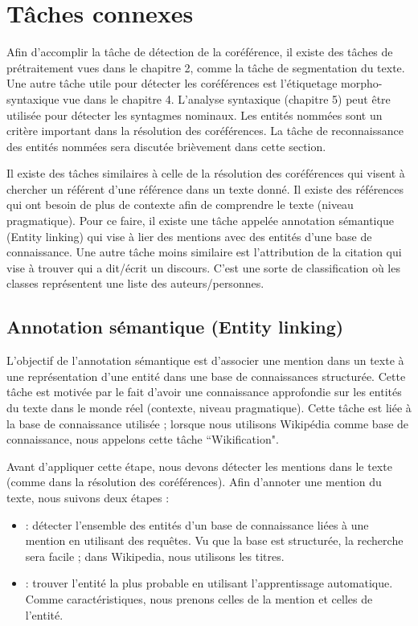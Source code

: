 \documentclass{KodeBook}
\begin{document}
\section{Tâches connexes}

Afin d'accomplir la tâche de détection de la coréférence, il existe des tâches de prétraitement vues dans le chapitre 2, comme la tâche de segmentation du texte. 
Une autre tâche utile pour détecter les coréférences est l'étiquetage morpho-syntaxique vue dans le chapitre 4.
L'analyse syntaxique (chapitre 5) peut être utilisée pour détecter les syntagmes nominaux. 
Les entités nommées sont un critère important dans la résolution des coréférences.
La tâche de reconnaissance des entités nommées sera discutée brièvement dans cette section.

Il existe des tâches similaires à celle de la résolution des coréférences qui visent à chercher un référent d'une référence dans un texte donné. 
Il existe des références qui ont besoin de plus de contexte afin de comprendre le texte (niveau pragmatique). 
Pour ce faire, il existe une tâche appelée annotation sémantique (Entity linking) qui vise à lier des mentions avec des entités d'une base de connaissance. 
Une autre tâche moins similaire est l'attribution de la citation qui vise à trouver qui a dit/écrit un discours. 
C'est une sorte de classification où les classes représentent une liste des auteurs/personnes.


\subsection{Annotation sémantique (Entity linking)}

L'objectif de l'annotation sémantique est d'associer une mention dans un texte à une représentation d'une entité dans une base de connaissances structurée. 
Cette tâche est motivée par le fait d'avoir une connaissance approfondie sur les entités du texte dans le monde réel (contexte, niveau pragmatique).
Cette tâche est liée à la base de connaissance utilisée ; lorsque nous utilisons Wikipédia comme base de connaissance, nous appelons cette tâche ``Wikification".

Avant d'appliquer cette étape, nous devons détecter les mentions dans le texte (comme dans la résolution des coréférences).
Afin d'annoter une mention du texte, nous suivons deux étapes :
\begin{itemize}
	\item {} : détecter l'ensemble des entités d'un base de connaissance liées à une mention en utilisant des requêtes.
	Vu que la base est structurée, la recherche sera facile ; dans Wikipedia, nous utilisons les titres.
	\item {} : trouver l'entité la plus probable en utilisant l'apprentissage automatique. 
	Comme caractéristiques, nous prenons celles de la mention et celles de l'entité.
\end{itemize}
\end{document}
